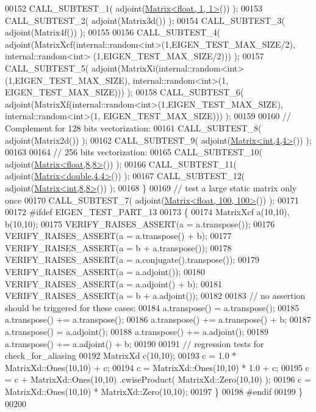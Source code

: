 \begin{DoxyCode}
00152     CALL\_SUBTEST\_1( adjoint(\hyperlink{group___core___module_class_eigen_1_1_matrix}{Matrix<float, 1, 1>}()) );
00153     CALL\_SUBTEST\_2( adjoint(Matrix3d()) );
00154     CALL\_SUBTEST\_3( adjoint(Matrix4f()) );
00155     
00156     CALL\_SUBTEST\_4( adjoint(MatrixXcf(internal::random<int>(1,EIGEN\_TEST\_MAX\_SIZE/2), internal::random<int>
      (1,EIGEN\_TEST\_MAX\_SIZE/2))) );
00157     CALL\_SUBTEST\_5( adjoint(MatrixXi(internal::random<int>(1,EIGEN\_TEST\_MAX\_SIZE), internal::random<int>(1,
      EIGEN\_TEST\_MAX\_SIZE))) );
00158     CALL\_SUBTEST\_6( adjoint(MatrixXf(internal::random<int>(1,EIGEN\_TEST\_MAX\_SIZE), internal::random<int>(1,
      EIGEN\_TEST\_MAX\_SIZE))) );
00159     
00160     \textcolor{comment}{// Complement for 128 bits vectorization:}
00161     CALL\_SUBTEST\_8( adjoint(Matrix2d()) );
00162     CALL\_SUBTEST\_9( adjoint(\hyperlink{group___core___module_class_eigen_1_1_matrix}{Matrix<int,4,4>}()) );
00163     
00164     \textcolor{comment}{// 256 bits vectorization:}
00165     CALL\_SUBTEST\_10( adjoint(\hyperlink{group___core___module_class_eigen_1_1_matrix}{Matrix<float,8,8>}()) );
00166     CALL\_SUBTEST\_11( adjoint(\hyperlink{group___core___module_class_eigen_1_1_matrix}{Matrix<double,4,4>}()) );
00167     CALL\_SUBTEST\_12( adjoint(\hyperlink{group___core___module_class_eigen_1_1_matrix}{Matrix<int,8,8>}()) );
00168   \}
00169   \textcolor{comment}{// test a large static matrix only once}
00170   CALL\_SUBTEST\_7( adjoint(\hyperlink{group___core___module_class_eigen_1_1_matrix}{Matrix<float, 100, 100>}()) );
00171 
00172 \textcolor{preprocessor}{#ifdef EIGEN\_TEST\_PART\_13}
00173   \{
00174     MatrixXcf a(10,10), b(10,10);
00175     VERIFY\_RAISES\_ASSERT(a = a.transpose());
00176     VERIFY\_RAISES\_ASSERT(a = a.transpose() + b);
00177     VERIFY\_RAISES\_ASSERT(a = b + a.transpose());
00178     VERIFY\_RAISES\_ASSERT(a = a.conjugate().transpose());
00179     VERIFY\_RAISES\_ASSERT(a = a.adjoint());
00180     VERIFY\_RAISES\_ASSERT(a = a.adjoint() + b);
00181     VERIFY\_RAISES\_ASSERT(a = b + a.adjoint());
00182 
00183     \textcolor{comment}{// no assertion should be triggered for these cases:}
00184     a.transpose() = a.transpose();
00185     a.transpose() += a.transpose();
00186     a.transpose() += a.transpose() + b;
00187     a.transpose() = a.adjoint();
00188     a.transpose() += a.adjoint();
00189     a.transpose() += a.adjoint() + b;
00190 
00191     \textcolor{comment}{// regression tests for check\_for\_aliasing}
00192     MatrixXd c(10,10);
00193     c = 1.0 * MatrixXd::Ones(10,10) + c;
00194     c = MatrixXd::Ones(10,10) * 1.0 + c;
00195     c = c + MatrixXd::Ones(10,10) .cwiseProduct( MatrixXd::Zero(10,10) );
00196     c = MatrixXd::Ones(10,10) * MatrixXd::Zero(10,10);
00197   \}
00198 \textcolor{preprocessor}{#endif}
00199 \}
00200 
\end{DoxyCode}
